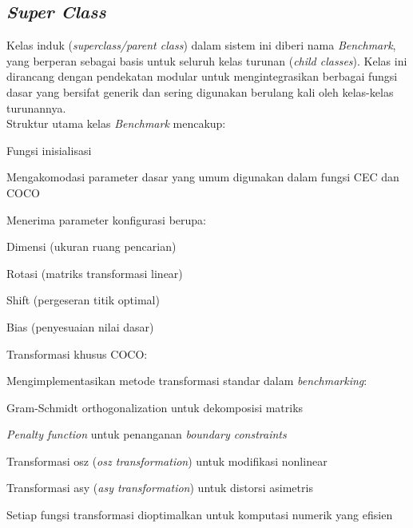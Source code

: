 \subsection{\textit{Super Class}}
Kelas induk (\textit{superclass/parent class}) dalam sistem ini diberi nama \textit{Benchmark}, yang berperan sebagai basis untuk seluruh kelas turunan (\textit{child classes}). Kelas ini dirancang dengan pendekatan modular untuk mengintegrasikan berbagai fungsi dasar yang bersifat generik dan sering digunakan berulang kali oleh kelas-kelas turunannya.\\
Struktur utama kelas \textit{Benchmark} mencakup:\\
\begin{packed_enum}
	\item Fungsi inisialisasi
	\begin{packed_enum}
		\item Mengakomodasi parameter dasar yang umum digunakan dalam fungsi  CEC dan COCO
		\item Menerima parameter konfigurasi berupa:
		\begin{packed_enum}
			\item Dimensi (ukuran ruang pencarian)
			\item Rotasi (matriks transformasi linear)
			\item Shift (pergeseran titik optimal)
			\item Bias (penyesuaian nilai dasar)
		\end{packed_enum}
	\end{packed_enum}
	\item Transformasi khusus COCO:
	\begin{packed_enum}
		\item Mengimplementasikan metode transformasi standar dalam \textit{benchmarking}:
		\begin{packed_enum}
			\item Gram-Schmidt orthogonalization untuk dekomposisi matriks
			\item \textit{Penalty function} untuk penanganan \textit{boundary constraints}
			\item Transformasi osz (\textit{osz transformation}) untuk modifikasi nonlinear
			\item Transformasi asy (\textit{asy transformation}) untuk distorsi asimetris
		\end{packed_enum}
		\item Setiap fungsi transformasi dioptimalkan untuk komputasi numerik yang efisien
	\end{packed_enum}
\end{packed_enum}
